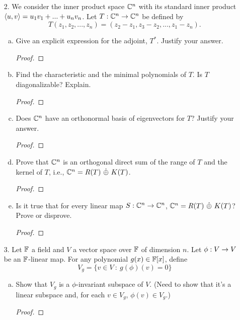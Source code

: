 \begin{itemize}
\begin{enumerate}[(a)]
\begin{proof}
    \end{proof}
\end{enumerate}







\item[2.] We consider the inner product space $\mathbb{C}^n$ with its standard inner product$ \langle{}u,v\rangle = u_1v_1 + ... + u_nv_n$. Let $T : \mathbb{C}^n \rightarrow \mathbb{C}^n$ be defined by
$$T(z_1, z_2, ..., z_n) = (z_2-z_1, z_3-z_2, ..., z_1-z_n).$$
\begin{enumerate}[(a)]
    \item Give an explicit expression for the adjoint, $T^{*}$. Justify your answer.
    \begin{proof}

    \end{proof}
    
    \item Find the characteristic and the minimal polynomials of $T$. Is $T$ diagonalizable? Explain.
    \begin{proof}

    \end{proof}
    
    \item Does $\mathbb{C}^n$ have an orthonormal basis of eigenvectors for $T$? Justify your answer.
    \begin{proof}

    \end{proof}
    
    \item Prove that $\mathbb{C}^n$ is an orthogonal direct sum of the range of $T$ and the kernel of $T$, i.e., $\bbc^n = R(T) \ \dot{\oplus} \ K(T)$.
    \begin{proof}

    \end{proof}
    
    \item Is it true that for every linear map $S : \mathbb{C}^n \rightarrow \mathbb{C}^n$, $\bbc^n = R(T) \ \dot{\oplus} \ K(T)$? Prove or disprove.
    \begin{proof}

    \end{proof}
\end{enumerate}







\item[3.] Let $\mathbb{F}$ a field and $V$ a vector space over $\mathbb{F}$ of dimension $n$. Let $\phi : V \rightarrow V$ be an
$\mathbb{F}$-linear map. For any polynomial $g(x) \in \mathbb{F}[x]$, define
$$V_g = \{v \in V \ : \ g(\phi)(v) = 0\}$$
\begin{enumerate}[(a)]
    \item Show that $V_g$ is a $\phi$-invariant subspace of $V$. (Need to show that it’s a linear subspace and, for each $v \in V_g$, $\phi(v) \in V_g$.)
    \begin{proof}


\end{proof}
\end{enumerate}
\end{itemize}
